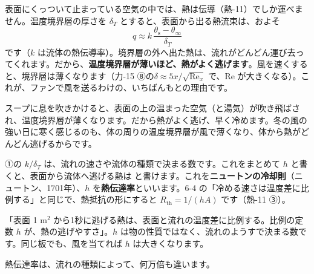 表面にくっついて止まっている空気の中では、熱は伝導（熱-11）でしか運べません。温度境界層の厚さを $\delta_T$ とすると、表面から出る熱流束は、およそ
\[q\approx k\,\frac{\theta_{\mathrm s}-\theta_\infty}{\delta_T}\]
です（$k$ は流体の熱伝導率）。境界層の外へ出た熱は、流れがどんどん運び去ってくれます。だから、\textbf{温度境界層が薄いほど、熱がよく逃げます}。風を速くすると、境界層は薄くなります（力-15 ⑧の$\delta\approx5x/\sqrt{\mathrm{Re}_x}$ で、Re が大きくなる）。これが、ファンで風を送るわけの、いちばんもとの理由です。

\begin{phmijika}
スープに息を吹きかけると、表面の上の温まった空気（と湯気）が吹き飛ばされ、温度境界層が薄くなります。だから熱がよく逃げ、早く冷めます。冬の風の強い日に寒く感じるのも、体の周りの温度境界層が風で薄くなり、体から熱がどんどん逃げるからです。
\end{phmijika}

\label{ph:熱-12:sec2}
①の $k/\delta_T$ は、流れの速さや流体の種類で決まる数です。これをまとめて $h$ と書くと、表面から流体へ逃げる熱は
と書けます。これを\textbf{ニュートンの冷却則}（ニュートン、1701年）、$h$ を\textbf{熱伝達率}といいます。6-4 の「冷める速さは温度差に比例する」と同じで、熱抵抗の形にすると $R_{\mathrm{th}}=1/(hA)$ です（熱-11 ③）。

\begin{phyomi}[$q=h\,\Delta T$]
「表面 1 m$^2$ から1秒に逃げる熱は、表面と流れの温度差に比例する。比例の定数 $h$ が、熱の逃げやすさ」。$h$ は物の性質ではなく、流れのようすで決まる数です。同じ板でも、風を当てれば $h$ は大きくなります。
\end{phyomi}

熱伝達率は、流れの種類によって、何万倍も違います。


